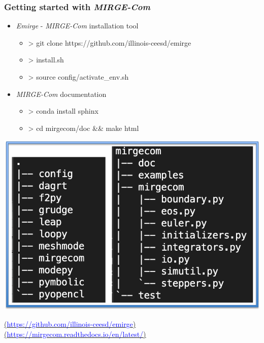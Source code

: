 \begin{frame}\frametitle{Getting started with \textit{MIRGE-Com}}
\begin{multicols}{2}
\begin{itemize}
  \item \textit{Emirge} - \textit{MIRGE-Com} installation tool
  \begin{itemize}
    \item > git clone https://github.com/illinois-ceesd/emirge
    \item > install.sh
    \item > source config/activate\_env.sh
  \end{itemize}
  \item \textit{MIRGE-Com} documentation
  \begin{itemize}
    \item > conda install sphinx
    \item > cd mirgecom/doc \&\& make html
  \end{itemize}
\end{itemize}
\includegraphics[width=.5\textwidth]{figures/dir_trees.png}
\end{multicols}
\begin{center}
\href{https://github.com/illinois-ceesd/emirge}{(\textcolor{blue}{https://github.com/illinois-ceesd/emirge})}
\href{https://mirgecom.readthedocs.io/en/latest/}{(\textcolor{blue}{https://mirgecom.readthedocs.io/en/latest/})}
\end{center}
\end{frame}

